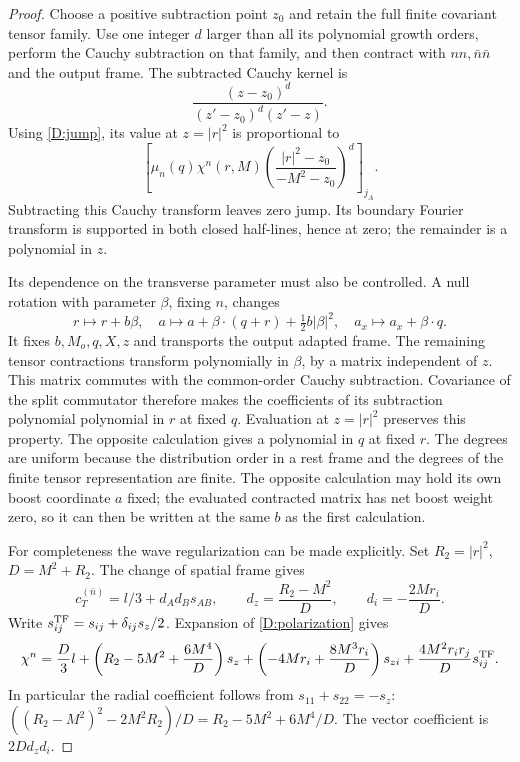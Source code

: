 \begin{proof}
Choose a positive subtraction point $z_0$ and retain the full finite
covariant tensor family.  Use one integer $d$ larger than all its
polynomial growth orders, perform the Cauchy subtraction on that
family, and then contract with $nn,\bar n\bar n$ and the output
frame.  The subtracted Cauchy kernel is
\[
 \frac{(z-z_0)^d}{(z'-z_0)^d(z'-z)}.
\]
Using \eqref{D:jump}, its value at $z=|r|^2$ is proportional to
\begin{equation}\label{D:cauchy-wave}
 \left[\mu_n(q)\chi^n(r,M)
 \left(\frac{|r|^2-z_0}{-M^2-z_0}\right)^d\right]_{j_A}.
\end{equation}
Subtracting this Cauchy transform leaves zero jump.  Its boundary
Fourier transform is supported in both closed half-lines, hence
at zero; the remainder is a polynomial in $z$.

Its dependence on the transverse parameter must also be controlled.
A null rotation with parameter $\beta$, fixing $n$, changes
\[
 r\longmapsto r+b\beta,\quad
 a\longmapsto a+\beta\cdot(q+r)+\tfrac12b|\beta|^2,\quad
 a_x\longmapsto a_x+\beta\cdot q.
\]
It fixes $b,M_o,q,X,z$ and transports the output adapted frame.
The remaining tensor contractions transform polynomially in
$\beta$, by a matrix independent of $z$.  This matrix commutes
with the common-order Cauchy subtraction.  Covariance of the split
commutator therefore makes the
coefficients of its subtraction polynomial polynomial in $r$ at
fixed $q$.  Evaluation at $z=|r|^2$ preserves this property.  The
opposite calculation gives a polynomial in $q$ at fixed $r$.
The degrees are uniform because the distribution order in a rest
frame and the degrees of the finite tensor representation are
finite.  The opposite calculation may hold its own boost coordinate
$a$ fixed; the evaluated contracted matrix has net boost weight zero,
so it can then be written at the same $b$ as the first calculation.

For completeness the wave regularization can be made explicitly.
Set $R_2=|r|^2$, $D=M^2+R_2$.  The change of spatial frame gives
\begin{equation}\label{D:polarization}
 c_T^{(\bar n)}=l/3+d_Ad_Bs_{AB},\qquad
 d_z=\frac{R_2-M^2}{D},\qquad d_i=-\frac{2Mr_i}{D}.
\end{equation}
Write $s_{ij}^{\rm TF}=s_{ij}+\delta_{ij}s_z/2$.  Expansion of
\eqref{D:polarization} gives
\begin{equation}\label{D:chi-expansion}
 \chi^n=\frac D3l+
 \left(R_2-5M^2+\frac{6M^4}{D}\right)s_z
 +\left(-4Mr_i+\frac{8M^3r_i}{D}\right)s_{zi}
 +\frac{4M^2r_ir_j}{D}s_{ij}^{\rm TF}.
\end{equation}
In particular the radial coefficient follows from
$s_{11}+s_{22}=-s_z$:
$((R_2-M^2)^2-2M^2R_2)/D=R_2-5M^2+6M^4/D$.
The vector coefficient is $2Dd_zd_i$.


\end{proof}
